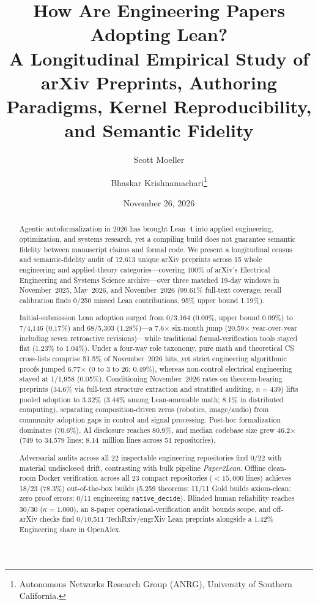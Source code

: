 \documentclass[11pt,letterpaper]{article}
\title{\textbf{How Are Engineering Papers Adopting Lean?}\\
\large A Longitudinal Empirical Study of arXiv Preprints, Authoring Paradigms, Kernel Reproducibility, and Semantic Fidelity}
\author{
  Scott Moeller \and Bhaskar Krishnamachari\thanks{Autonomous Networks Research Group (ANRG), University of Southern California.}
}
\date{November 26, 2026}
\begin{document}
\sloppy
\maketitle

\begin{abstract}
Agentic autoformalization in 2026 has brought Lean~4 into applied engineering, optimization, and systems research, yet a compiling build does not guarantee semantic fidelity between manuscript claims and formal code. We present a longitudinal census and semantic-fidelity audit of 12,613 unique arXiv preprints across 15 whole engineering and applied-theory categories---covering 100\% of arXiv's Electrical Engineering and Systems Science archive---over three matched 19-day windows in November~2025, May~2026, and November~2026 (99.61\% full-text coverage; recall calibration finds 0/250 missed Lean contributions, 95\% upper bound 1.19\%).

Initial-submission Lean adoption surged from 0/3,164 (0.00\%, upper bound 0.09\%) to 7/4,146 (0.17\%) and 68/5,303 (1.28\%)---a 7.6$\times$ six-month jump (20.59$\times$ year-over-year including seven retroactive revisions)---while traditional formal-verification tools stayed flat (1.23\% to 1.04\%). Under a four-way role taxonomy, pure math and theoretical CS cross-lists comprise 51.5\% of November~2026 hits, yet strict engineering algorithmic proofs jumped 6.77$\times$ (0 to 3 to 26; 0.49\%), whereas non-control electrical engineering stayed at 1/1,958 (0.05\%). Conditioning November~2026 rates on theorem-bearing preprints (34.6\% via full-text structure extraction and stratified auditing, $n=439$) lifts pooled adoption to 3.32\% (3.44\% among Lean-amenable math; 8.1\% in distributed computing), separating composition-driven zeros (robotics, image/audio) from community adoption gaps in control and signal processing. Post-hoc formalization dominates (70.6\%), AI disclosure reaches 80.9\%, and median codebase size grew 46.2$\times$ (749 to 34,579 lines; 8.14~million lines across 51 repositories).

Adversarial audits across all 22 inspectable engineering repositories find 0/22 with material undisclosed drift, contrasting with bulk pipeline \emph{Paper2Lean}. Offline clean-room Docker verification across all 23 compact repositories ($<15{,}000$ lines) achieves 18/23 (78.3\%) out-of-the-box builds (5,259 theorems; 11/11 Gold builds axiom-clean; zero proof errors; 0/11 engineering \texttt{native\_decide}). Blinded human reliability reaches 30/30 ($\kappa = 1.000$), an 8-paper operational-verification audit bounds scope, and off-arXiv checks find 0/10,511 TechRxiv/engrXiv Lean preprints alongside a 1.42\% Engineering share in OpenAlex.
\end{abstract}
\end{document}
